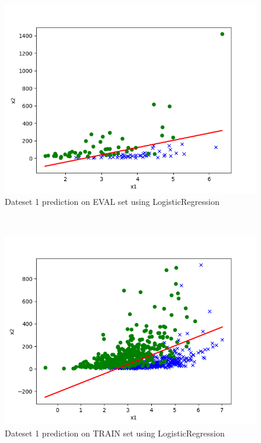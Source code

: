 \begin{answer}\\
\begin{figure}
  \includegraphics[width=\linewidth]{../src/output/p01b_pred_1_eval.png}
  \caption{Dateset 1 prediction on EVAL set using LogisticRegression}
  \label{fig:Dateset 1 prediction on EVAL set using LogisticRegression}
\end{figure}\\
\begin{figure}
  \includegraphics[width=\linewidth]{../src/output/p01b_pred_1_train.png}
  \caption{Dateset 1 prediction on TRAIN set using LogisticRegression}
  \label{fig:Dateset 1 prediction on TRAIN set using LogisticRegression}
\end{figure}\\

\end{answer}
